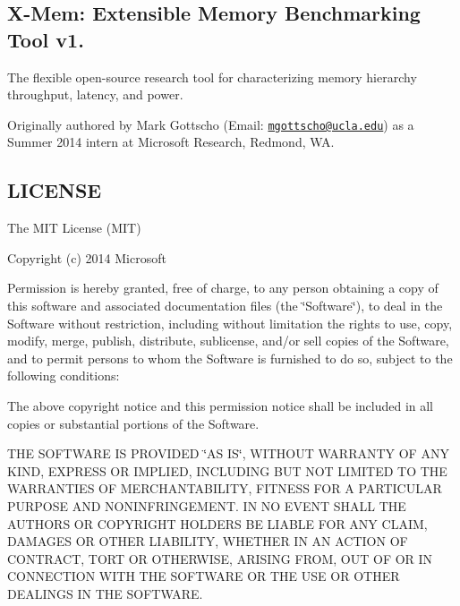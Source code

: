 \subsection*{X-\/\+Mem\+: Extensible Memory Benchmarking Tool v1. }

The flexible open-\/source research tool for characterizing memory hierarchy throughput, latency, and power.

Originally authored by Mark Gottscho (Email\+: \href{mailto:mgottscho@ucla.edu}{\tt mgottscho@ucla.\+edu}) as a Summer 2014 intern at Microsoft Research, Redmond, W\+A. 

 \subsection*{L\+I\+C\+E\+N\+S\+E }

The M\+I\+T License (M\+I\+T)

Copyright (c) 2014 Microsoft

Permission is hereby granted, free of charge, to any person obtaining a copy of this software and associated documentation files (the \char`\"{}\+Software\char`\"{}), to deal in the Software without restriction, including without limitation the rights to use, copy, modify, merge, publish, distribute, sublicense, and/or sell copies of the Software, and to permit persons to whom the Software is furnished to do so, subject to the following conditions\+:

The above copyright notice and this permission notice shall be included in all copies or substantial portions of the Software.

T\+H\+E S\+O\+F\+T\+W\+A\+R\+E I\+S P\+R\+O\+V\+I\+D\+E\+D \char`\"{}\+A\+S I\+S\char`\"{}, W\+I\+T\+H\+O\+U\+T W\+A\+R\+R\+A\+N\+T\+Y O\+F A\+N\+Y K\+I\+N\+D, E\+X\+P\+R\+E\+S\+S O\+R I\+M\+P\+L\+I\+E\+D, I\+N\+C\+L\+U\+D\+I\+N\+G B\+U\+T N\+O\+T L\+I\+M\+I\+T\+E\+D T\+O T\+H\+E W\+A\+R\+R\+A\+N\+T\+I\+E\+S O\+F M\+E\+R\+C\+H\+A\+N\+T\+A\+B\+I\+L\+I\+T\+Y, F\+I\+T\+N\+E\+S\+S F\+O\+R A P\+A\+R\+T\+I\+C\+U\+L\+A\+R P\+U\+R\+P\+O\+S\+E A\+N\+D N\+O\+N\+I\+N\+F\+R\+I\+N\+G\+E\+M\+E\+N\+T. I\+N N\+O E\+V\+E\+N\+T S\+H\+A\+L\+L T\+H\+E A\+U\+T\+H\+O\+R\+S O\+R C\+O\+P\+Y\+R\+I\+G\+H\+T H\+O\+L\+D\+E\+R\+S B\+E L\+I\+A\+B\+L\+E F\+O\+R A\+N\+Y C\+L\+A\+I\+M, D\+A\+M\+A\+G\+E\+S O\+R O\+T\+H\+E\+R L\+I\+A\+B\+I\+L\+I\+T\+Y, W\+H\+E\+T\+H\+E\+R I\+N A\+N A\+C\+T\+I\+O\+N O\+F C\+O\+N\+T\+R\+A\+C\+T, T\+O\+R\+T O\+R O\+T\+H\+E\+R\+W\+I\+S\+E, A\+R\+I\+S\+I\+N\+G F\+R\+O\+M, O\+U\+T O\+F O\+R I\+N C\+O\+N\+N\+E\+C\+T\+I\+O\+N W\+I\+T\+H T\+H\+E S\+O\+F\+T\+W\+A\+R\+E O\+R T\+H\+E U\+S\+E O\+R O\+T\+H\+E\+R D\+E\+A\+L\+I\+N\+G\+S I\+N T\+H\+E S\+O\+F\+T\+W\+A\+R\+E. 

